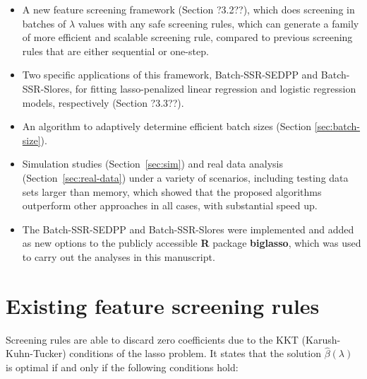 \documentclass{article}
\begin{document}
\begin{itemize}
    \item A new feature screening framework (Section ?3.2??), which does screening in batches of $\lambda$ values with any safe screening rules, which can generate a family of more efficient and scalable screening rule, compared to previous screening rules that are either sequential or one-step.
    \item Two specific applications of this framework, Batch-SSR-SEDPP and Batch-SSR-Slores, for fitting lasso-penalized linear regression and logistic regression models, respectively (Section ?3.3??).
    \item An algorithm to adaptively determine efficient batch sizes (Section \ref{sec:batch-size}).
    \item Simulation studies (Section~\ref{sec:sim}) and real data analysis (Section~\ref{sec:real-data}) under a variety of scenarios, including testing data sets larger than memory, which showed that the proposed algorithms outperform other approaches in all cases, with substantial speed up.
    \item The Batch-SSR-SEDPP and Batch-SSR-Slores were implemented and added as new options to the publicly accessible \textbf{R} package \textbf{biglasso}\cite{zeng2017biglasso}, which was used to carry out the analyses in this manuscript.
\end{itemize}

\section{Existing feature screening rules}
\label{sec:existing}


Screening rules are able to discard zero coefficients due to the KKT (Karush-Kuhn-Tucker) conditions of the lasso problem. It states that the solution $\hat{\beta}(\lambda)$ is optimal if and only if the following conditions hold:
\end{document}
